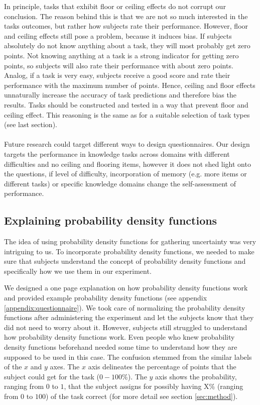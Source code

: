 \documentclass[../main/main.tex]{subfiles}
\begin{document}
	In principle, tasks that exhibit floor or ceiling effects do not corrupt our conclusion. The reason behind this is that we are not so much interested in the tasks outcomes, but rather how subjects rate their performance. However, floor and ceiling effects still pose a problem, because it induces bias. If subjects absolutely do not know anything about a task, they will most probably get zero points. Not knowing anything at a task is a strong indicator for getting zero points, so subjects will also rate their performance with about zero points. Analog, if a task is very easy, subjects receive a good score and rate their performance with the maximum number of points. Hence, ceiling and floor effects unnaturally increase the accuracy of task predictions and therefore bias the results. Tasks should be constructed and tested in a way that prevent floor and ceiling effect. This reasoning is the same as for a suitable selection of task types (see last section).
	\\\\
	Future research could target different ways to design questionnaires. Our design targets the performance in knowledge tasks across domains with different difficulties and no ceiling and flooring items, however it does not shed light onto the questions, if level of difficulty, incorporation of memory (e.g. more items or different tasks) or specific knowledge domains change the self-assessment of performance.
	
	
	\subsection{Explaining probability density functions}
	\label{sec:explaining_pdf}
	
	The idea of using probability density functions for gathering uncertainty was very intriguing to us. To incorporate probability density functions, we needed to make sure that subjects understand the concept of probability density functions and specifically how we use them in our experiment. 
	
	We designed a one page explanation on how probability density functions work and provided example probability density functions (see appendix \ref{appendix:questionnaire}). We took care of normalizing the probability density functions after administering the experiment and let the subjects know that they did not need to worry about it. However, subjects still  struggled to understand how probability density functions work. Even people who knew probability density functions beforehand needed some time to understand how they are supposed to be used in this case. The confusion stemmed from the similar labels of the $x$ and $y$ axes. The $x$ axis delineates the percentage of points that the subject could get for the task ($0-100\%$). The $y$ axis shows the probability, ranging from $0$ to $1$, that the subject assigns for possibly having X\% (ranging from $0$ to $100$) of the task correct (for more detail see section \ref{sec:method}).
	
\end{document}
